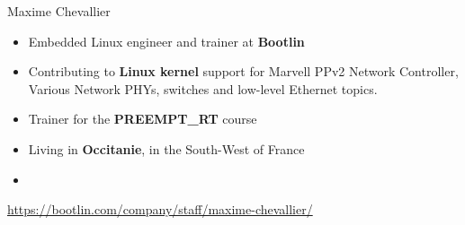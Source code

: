 \begin{frame}{Maxime Chevallier}
    \begin{itemize}
	\item Embedded Linux engineer and trainer at {\bf Bootlin}
	\item Contributing to {\bf Linux kernel} support for Marvell PPv2
		Network Controller, Various Network PHYs, switches and low-level
		    Ethernet topics.
	    \item Trainer for the {\bf PREEMPT\_RT} course
	\item Living in {\bf Occitanie}, in the South-West of France
	\item {}
    \end{itemize}
    {\small \url{https://bootlin.com/company/staff/maxime-chevallier/}}
\end{frame}
